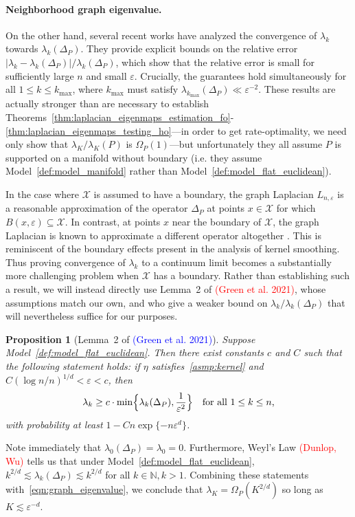 \documentclass{article}
\newcommand{\1}{\mathbf{1}}
\newcommand{\mc}[1]{\mathcal{#1}}
\theoremstyle{alden}
\theoremstyle{aldenthm}
\newtheorem{proposition}{Proposition}
\theoremstyle{definition}
\theoremstyle{remark}
\begin{document}
\paragraph{Neighborhood graph eigenvalue.}
On the other hand, several recent works \citep{burago2014,garciatrillos18,calder2019} have analyzed the convergence of $\lambda_{k}$ towards $\lambda_{k}(\Delta_P)$. They provide explicit bounds on the relative error $|\lambda_{k} - \lambda_{k}(\Delta_P)|/\lambda_{k}(\Delta_P)$, which show that the relative error is small for sufficiently large $n$ and small $\varepsilon$. Crucially, the guarantees hold simultaneously for all $1 \leq k \leq k_{\max}$, where $k_{\max}$ must satisfy $\lambda_{k_{\max}}(\Delta_P) \ll \varepsilon^{-2}$. These results are actually stronger than are necessary to establish Theorems~\ref{thm:laplacian_eigenmaps_estimation_fo}-\ref{thm:laplacian_eigenmaps_testing_ho}---in order to get rate-optimality, we need only show that $\lambda_{K}/\lambda_K(P)$ is $\Omega_P(1)$---but unfortunately they all assume $P$ is supported on a manifold without boundary (i.e. they assume Model~\ref{def:model_manifold} rather than Model~\ref{def:model_flat_euclidean}). 

In the case where $\mc{X}$ is assumed to have a boundary, the graph Laplacian $L_{n,\varepsilon}$ is a reasonable approximation of the operator $\Delta_P$ at points $x \in \mc{X}$ for which $B(x,\varepsilon) \subseteq \mc{X}$. In contrast, at points $x$ near the boundary of $\mc{X}$, the graph Laplacian is known to approximate a different operator altogether \citep{belkin2012}. This is reminiscent of the boundary effects present in the analysis of kernel smoothing. Thus proving convergence of $\lambda_k$ to a continuum limit becomes a substantially more challenging problem when $\mc{X}$ has a boundary. Rather than establishing such a result, we will instead directly use Lemma~2 of \textcolor{red}{(Green et al. 2021)}, whose assumptions match our own, and who give a weaker bound on $\lambda_k/\lambda_k(\Delta_P)$ that will nevertheless suffice for our purposes. 

\begin{proposition}[Lemma~2 of \textcolor{blue}{(Green et al. 2021)}]
	\label{prop:graph_eigenvalue}
	Suppose Model~\ref{def:model_flat_euclidean}. Then there exist constants $c$ and $C$ such that the following statement holds: if $\eta$ satisfies~\ref{asmp:kernel} and $C(\log n/n)^{1/d} < \varepsilon < c$, then
	\begin{equation}
	\label{eqn:graph_eigenvalue}
	\lambda_k \geq c \cdot \min\Bigl\{\lambda_k(\Delta_P), \frac{1}{\varepsilon^{2}} \Bigr\} \quad \textrm{for all $1 \leq k \leq n$,}
	\end{equation}
	with probability at least $1 - Cn\exp\{-n\varepsilon^d\}$. 
\end{proposition}
Note immediately that $\lambda_0(\Delta_P) = \lambda_0 = 0$. Furthermore, Weyl's Law \textcolor{red}{(Dunlop, Wu)} tells us that under Model~\ref{def:model_flat_euclidean}, $k^{2/d} \lesssim \lambda_{k}(\Delta_P) \lesssim k^{2/d}$ for all $k \in \mathbb{N}, k > 1$. Combining these statements with~\eqref{eqn:graph_eigenvalue}, we conclude that $\lambda_{K} = \Omega_P(K^{2/d})$ so long as $K \lesssim \varepsilon^{-d}$. 
\end{document}
